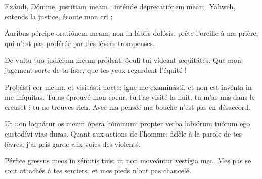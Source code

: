 
\begin{paracol}{2}

\LigneParacol{0cm}
{Exáudi, Dómine, justítiam meam : \GreStar{} inténde deprecatiónem meam.}
{Yahweh, entends la justice, écoute mon cri ;}

\LigneParacol{0.2cm}
{Áuribus pércipe oratiónem meam, \GreStar{} non in lábiis dolósis.}
{prête l'oreille à ma prière, qui n'est pas proférée par des lèvres trompeuses. }

\LigneParacol{0.2cm}
{De vultu tuo judícium meum pródeat: \GreStar{} óculi tui vídeant æquitátes.}
{Que mon jugement sorte de ta face, que tes yeux regardent l'équité ! }

\LigneParacol{0.2cm}
{Probásti cor meum, et visitásti nocte: \GreStar{} igne me examinásti, et non est invénta in me iníquitas.}
{Tu as éprouvé mon coeur, tu l'as visité la nuit, tu m'as mis dans le creuset : tu ne trouves rien. Avec ma pensée ma bouche n'est pas en désaccord. }

\LigneParacol{0.2cm}
{Ut non loquátur os meum ópera hóminum: \GreStar{} propter verba labiórum tuórum ego custodívi vias duras.}
{Quant aux actions de l'homme, fidèle à la parole de tes lèvres; j'ai pris garde aux voies des violents. }

\LigneParacol{0.2cm}
{Pérfice gressus meos in sémitis tuis: \GreStar{} ut non moveántur vestígia mea.}
{Mes pas se sont attachés à tes sentiers, et mes pieds n'ont pas chancelé. }

\end{paracol}
\Gloria
